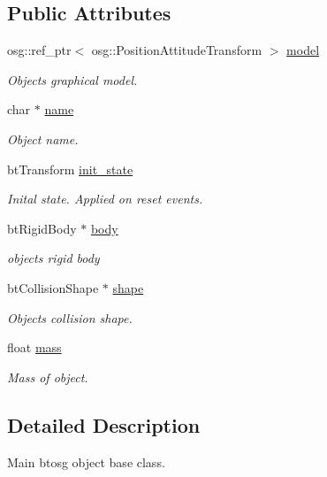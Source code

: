 \subsection*{Public Attributes}
\begin{DoxyCompactItemize}
\item 
osg\+::ref\+\_\+ptr$<$ osg\+::\+Position\+Attitude\+Transform $>$ \hyperlink{classbtosgObject_afd15726e7a214212d6d5815f8ac1ac6c}{model}
\begin{DoxyCompactList}\small\item\em Object\textquotesingle{}s graphical model. \end{DoxyCompactList}\item 
char $\ast$ \hyperlink{classbtosgObject_a12396e1362797a75473a2e833b579cc9}{name}
\begin{DoxyCompactList}\small\item\em Object name. \end{DoxyCompactList}\item 
bt\+Transform \hyperlink{classbtosgObject_a2dee023f311114e200df9b04c8c1b400}{init\+\_\+state}
\begin{DoxyCompactList}\small\item\em Inital state. Applied on reset events. \end{DoxyCompactList}\item 
bt\+Rigid\+Body $\ast$ \hyperlink{classbtosgObject_a64ccde0543c184ed1749fdb9c9699785}{body}
\begin{DoxyCompactList}\small\item\em object\textquotesingle{}s rigid body \end{DoxyCompactList}\item 
bt\+Collision\+Shape $\ast$ \hyperlink{classbtosgObject_a0f6a8da01cf643c321bffe86e42604b0}{shape}
\begin{DoxyCompactList}\small\item\em Object\textquotesingle{}s collision shape. \end{DoxyCompactList}\item 
float \hyperlink{classbtosgObject_a2418bb2194d5e9b0f1c51c84672ba7d1}{mass}
\begin{DoxyCompactList}\small\item\em Mass of object. \end{DoxyCompactList}\end{DoxyCompactItemize}


\subsection{Detailed Description}
Main btosg object base class. 

